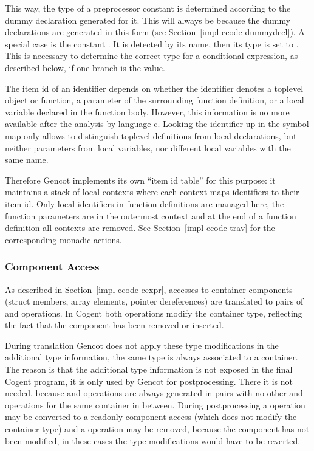 This way, the type of a preprocessor constant is determined according to the dummy declaration generated for it. This
will always be  because the dummy declarations are generated in this form (see Section~\ref{impl-ccode-dummydecl}).
A special case is the constant . It is detected by its name, then its type is set to .
This is necessary to determine the correct type for a conditional expression, as described below, if one branch is
the  value.

The item id of an identifier depends on whether the identifier denotes a toplevel object or function, a parameter
of the surrounding function definition, or a local variable declared in the function body. However, this information is
no more available after the analysis by language-c. Looking the identifier up in the symbol map only allows to
distinguish toplevel definitions from local declarations, but neither parameters from local variables, nor different
local variables with the same name.

Therefore Gencot implements its own ``item id table'' for this purpose: it maintains a stack of local contexts
where each context maps identifiers to their item id. Only local identifiers in function definitions are managed here,
the function parameters are in the outermost context and at the end of a function definition all contexts are removed.
See Section~\ref{impl-ccode-trav} for the corresponding monadic actions.

\subsubsection{Component Access}

As described in Section~\ref{impl-ccode-cexpr}, accesses to container components (struct members, array elements, pointer
dereferences) are translated to pairs of  and  operations. In Cogent both operations modify the
container type, reflecting the fact that the component has been removed or inserted.

During translation Gencot does not apply these type modifications in the additional type information, the same type is always
associated to a container. The reason is that the additional type information is not exposed in the final Cogent program,
it is only used by Gencot for postprocessing. There it is not needed, because  and  operations are always
generated in pairs with no other  and  operations for the same container in between. During postprocessing
a  operation may be converted to a readonly component access (which does not
modify the container type) and a  operation may be removed, because the component has not been modified, in these
cases the type modifications would have to be reverted.

